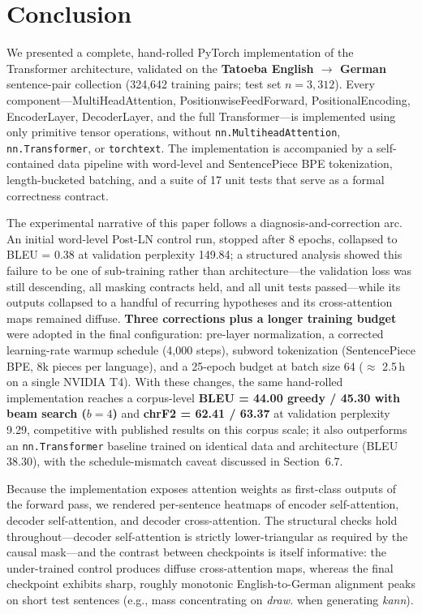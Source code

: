 \documentclass[10pt]{article}
\begin{document}
\section{Conclusion}

We presented a complete, hand-rolled PyTorch implementation of the Transformer architecture, validated on the \textbf{Tatoeba English $\rightarrow$ German} sentence-pair collection (324,642 training pairs; test set $n = 3{,}312$). Every component---MultiHeadAttention, PositionwiseFeedForward, PositionalEncoding, EncoderLayer, DecoderLayer, and the full Transformer---is implemented using only primitive tensor operations, without \texttt{nn.MultiheadAttention}, \texttt{nn.Transformer}, or \texttt{torchtext}. The implementation is accompanied by a self-contained data pipeline with word-level and SentencePiece BPE tokenization, length-bucketed batching, and a suite of 17 unit tests that serve as a formal correctness contract.

The experimental narrative of this paper follows a diagnosis-and-correction arc. An initial word-level Post-LN control run, stopped after 8 epochs, collapsed to BLEU = 0.38 at validation perplexity 149.84; a structured analysis showed this failure to be one of sub-training rather than architecture---the validation loss was still descending, all masking contracts held, and all unit tests passed---while its outputs collapsed to a handful of recurring hypotheses and its cross-attention maps remained diffuse. \textbf{Three corrections plus a longer training budget} were adopted in the final configuration: pre-layer normalization, a corrected learning-rate warmup schedule (4{,}000 steps), subword tokenization (SentencePiece BPE, 8k pieces per language), and a 25-epoch budget at batch size 64 ($\approx$ 2.5\,h on a single NVIDIA T4). With these changes, the same hand-rolled implementation reaches a corpus-level \textbf{BLEU = 44.00 greedy / 45.30 with beam search ($b=4$)} and \textbf{chrF2 = 62.41 / 63.37} at validation perplexity 9.29, competitive with published results on this corpus scale; it also outperforms an \texttt{nn.Transformer} baseline trained on identical data and architecture (BLEU 38.30), with the schedule-mismatch caveat discussed in Section~6.7.

Because the implementation exposes attention weights as first-class outputs of the forward pass, we rendered per-sentence heatmaps of encoder self-attention, decoder self-attention, and decoder cross-attention. The structural checks hold throughout---decoder self-attention is strictly lower-triangular as required by the causal mask---and the contrast between checkpoints is itself informative: the under-trained control produces diffuse cross-attention maps, whereas the final checkpoint exhibits sharp, roughly monotonic English-to-German alignment peaks on short test sentences (e.g., mass concentrating on \textit{draw.} when generating \textit{kann}).
\end{document}

